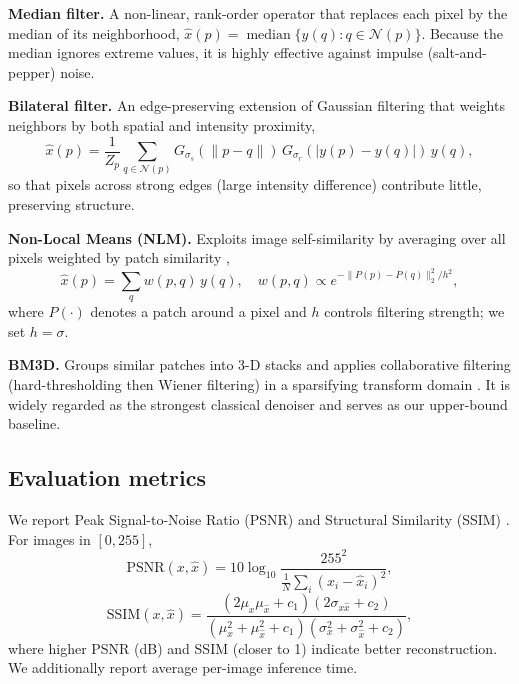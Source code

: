 \documentclass[conference]{IEEEtran}
\begin{document}
\textbf{Median filter.} A non-linear, rank-order operator that replaces each
pixel by the median of its neighborhood,
$\hat{x}(p)=\operatorname{median}\{y(q): q\in\mathcal{N}(p)\}$. Because the median
ignores extreme values, it is highly effective against impulse (salt-and-pepper)
noise.

\textbf{Bilateral filter.} An edge-preserving extension of Gaussian filtering
that weights neighbors by both spatial and intensity proximity,
\begin{equation}
\hat{x}(p)=\frac{1}{Z_p}\sum_{q\in\mathcal{N}(p)}
G_{\sigma_s}(\lVert p-q\rVert)\,G_{\sigma_r}(|y(p)-y(q)|)\,y(q),
\end{equation}
so that pixels across strong edges (large intensity difference) contribute
little, preserving structure.

\textbf{Non-Local Means (NLM).} Exploits image self-similarity by averaging over
all pixels weighted by patch similarity \cite{buades2005},
\begin{equation}
\hat{x}(p)=\sum_{q} w(p,q)\,y(q),\quad
w(p,q)\propto e^{-\lVert P(p)-P(q)\rVert_2^2 / h^2},
\end{equation}
where $P(\cdot)$ denotes a patch around a pixel and $h$ controls filtering
strength; we set $h=\sigma$.

\textbf{BM3D.} Groups similar patches into 3-D stacks and applies collaborative
filtering (hard-thresholding then Wiener filtering) in a sparsifying transform
domain \cite{dabov2007}. It is widely regarded as the strongest classical
denoiser and serves as our upper-bound baseline.

\subsection{Evaluation metrics}
We report Peak Signal-to-Noise Ratio (PSNR) and Structural Similarity (SSIM)
\cite{wang2004ssim}. For images in $[0,255]$,
\begin{equation}
\mathrm{PSNR}(x,\hat{x}) = 10\log_{10}\frac{255^2}{\frac{1}{N}\sum_i (x_i-\hat{x}_i)^2},
\end{equation}
\begin{equation}
\mathrm{SSIM}(x,\hat{x}) = \frac{(2\mu_x\mu_{\hat{x}}+c_1)(2\sigma_{x\hat{x}}+c_2)}
{(\mu_x^2+\mu_{\hat{x}}^2+c_1)(\sigma_x^2+\sigma_{\hat{x}}^2+c_2)},
\end{equation}
where higher PSNR (dB) and SSIM (closer to 1) indicate better reconstruction.
We additionally report average per-image inference time.
\end{document}

